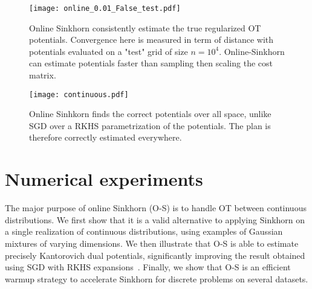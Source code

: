 \begin{figure}[t]
    \centering
    \texttt{[image: online\_0.01\_False\_test.pdf]}
    \caption{Online Sinkhorn consistently estimate the true regularized OT potentials. Convergence here is measured in term of distance with potentials evaluated on a "test" grid of size $n=10^4$. Online-Sinkhorn can estimate potentials faster than sampling then scaling the cost matrix.}
    \label{fig:convergence}
\end{figure}

\begin{figure}[t]
    \centering
    \texttt{[image: continuous.pdf]}
    \caption{Online Sinhkorn finds the correct potentials over all space, unlike SGD over a RKHS parametrization of the potentials. The plan is therefore correctly estimated everywhere.}
    \label{fig:potentials}
\end{figure}

\section{Numerical experiments}\label{sec:exps}



The major purpose of online Sinkhorn (O-S) is to handle OT between continuous
distributions.  We first show that it is a valid alternative to applying Sinkhorn 
on a single realization of continuous distributions, using examples of Gaussian mixtures of varying dimensions. 
%
We then illustrate that O-S is able to estimate precisely 
Kantorovich dual potentials, significantly improving the result obtained using SGD with RKHS
expansions~\citep{2016-genevay-nips}. 
%
Finally, we show that O-S is an efficient warmup strategy to accelerate Sinkhorn for discrete problems on several datasets.


